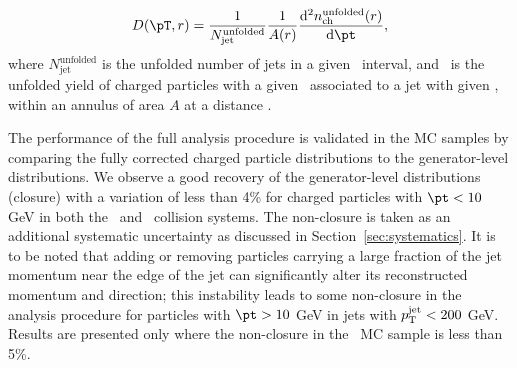 \begin{align*}
   \Dptr = \frac{1}{N_\mathrm{jet}^\mathrm{unfolded}} \frac{1}{A(r)} \frac{\fd^2 \nchunf(r)}{\fd \pt},
 \end{align*}
where $N_\mathrm{jet}^\mathrm{unfolded}$ is the unfolded number of jets in a given \ptjet\ interval, and \nchunf\  is the unfolded yield of charged particles with a given \pt\ associated to a jet with given \ptjet, within an annulus of area $A$ at a distance \rvar.

The performance of the full analysis procedure is validated in the MC samples by comparing the fully corrected charged particle distributions to the generator-level distributions. We observe a good recovery of the generator-level distributions (closure) with a variation of less than 4\% for charged particles with $\pt < 10$ GeV in both the \pp\ and \pbpb\ collision systems. The non-closure is taken as an additional systematic uncertainty as discussed in Section~\ref{sec:systematics}.
It is to be noted that adding or removing particles carrying a large fraction of the jet momentum near the edge of the jet can significantly alter its
reconstructed momentum and direction; this instability leads to some non-closure in the analysis procedure for particles with $\pt > 10$ GeV in jets with $\mbox{$p_{\mathrm{T}}^{\mathrm{jet}}$} < 200$ GeV. 
Results are presented only where the non-closure in the \pp\ MC sample is less than 5\%.




